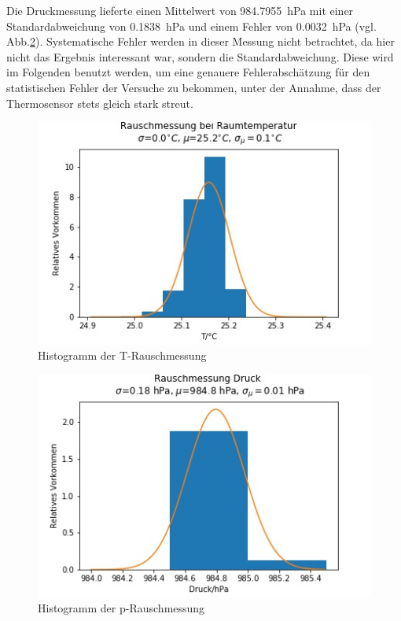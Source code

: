 \documentclass[]{article}
\begin{document}
Die Druckmessung lieferte einen Mittelwert von \SI{984.7955}{\hecto \pascal} mit einer Standardabweichung von \SI{0.1838}{\hecto \pascal} und einem Fehler von \SI{0.0032}{\hecto \pascal} (vgl. Abb.\ref{RM_p_histo}).
Systematische Fehler werden in dieser Messung nicht betrachtet, da hier nicht das Ergebnis interessant war, sondern die Standardabweichung. Diese wird im Folgenden benutzt werden, um eine genauere Fehlerabschätzung für den statistischen Fehler der Versuche zu bekommen, unter der Annahme, dass der Thermosensor stets gleich stark streut.
\begin{figure}
	\begin{center}
		\includegraphics[scale=0.9]{Images/RauschmessungRT_T_histo.jpg}
		\caption{Histogramm der T-Rauschmessung}
		\label{RM_T_histo}
	\end{center}
\end{figure}
\begin{figure}
	\begin{center}
		\includegraphics[scale=0.9]{Images/RauschmessungRT_p_histo.jpg}
		\caption{Histogramm der p-Rauschmessung}
		\label{RM_p_histo}
	\end{center}
\end{figure}
\end{document}
